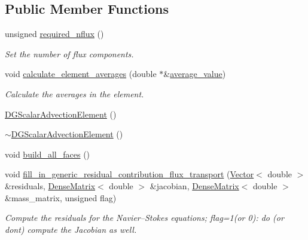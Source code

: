 \subsection*{Public Member Functions}
\begin{DoxyCompactItemize}
\item 
unsigned \hyperlink{classoomph_1_1DGScalarAdvectionElement_3_011_00_01NNODE__1D_01_4_ae2edc6f1cca20b5308f50e1ae24bd6cd}{required\+\_\+nflux} ()
\begin{DoxyCompactList}\small\item\em Set the number of flux components. \end{DoxyCompactList}\item 
void \hyperlink{classoomph_1_1DGScalarAdvectionElement_3_011_00_01NNODE__1D_01_4_ae516160e4873adc0e599394db991a507}{calculate\+\_\+element\+\_\+averages} (double $\ast$\&\hyperlink{classoomph_1_1DGElement_a9349e3c349f9cf3b25bcb6121e86a7f2}{average\+\_\+value})
\begin{DoxyCompactList}\small\item\em Calculate the averages in the element. \end{DoxyCompactList}\item 
\hyperlink{classoomph_1_1DGScalarAdvectionElement_3_011_00_01NNODE__1D_01_4_a96a7d8286a6afcb5b01f61b2f7ec3e34}{D\+G\+Scalar\+Advection\+Element} ()
\item 
\hyperlink{classoomph_1_1DGScalarAdvectionElement_3_011_00_01NNODE__1D_01_4_a586b83379ef09c417989485b12fbf5ae}{$\sim$\+D\+G\+Scalar\+Advection\+Element} ()
\item 
void \hyperlink{classoomph_1_1DGScalarAdvectionElement_3_011_00_01NNODE__1D_01_4_a18b03341945a2664a74f7b276e755439}{build\+\_\+all\+\_\+faces} ()
\item 
void \hyperlink{classoomph_1_1DGScalarAdvectionElement_3_011_00_01NNODE__1D_01_4_af3ef17f8ddb6034430fb873ea8dd4ba3}{fill\+\_\+in\+\_\+generic\+\_\+residual\+\_\+contribution\+\_\+flux\+\_\+transport} (\hyperlink{classoomph_1_1Vector}{Vector}$<$ double $>$ \&residuals, \hyperlink{classoomph_1_1DenseMatrix}{Dense\+Matrix}$<$ double $>$ \&jacobian, \hyperlink{classoomph_1_1DenseMatrix}{Dense\+Matrix}$<$ double $>$ \&mass\+\_\+matrix, unsigned flag)
\begin{DoxyCompactList}\small\item\em Compute the residuals for the Navier--Stokes equations; flag=1(or 0)\+: do (or don\textquotesingle{}t) compute the Jacobian as well. \end{DoxyCompactList}\end{DoxyCompactItemize}

